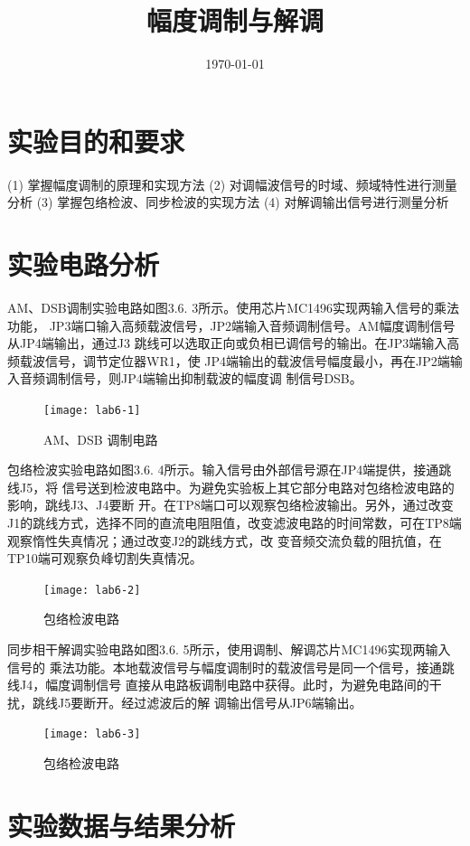 \documentclass{../source/Experiment}
\title{幅度调制与解调}
\date{\today}
\begin{document}
\makecover
\makeheader


\section{实验目的和要求}
    (1) 掌握幅度调制的原理和实现方法
    (2) 对调幅波信号的时域、频域特性进行测量分析
    (3) 掌握包络检波、同步检波的实现方法
    (4) 对解调输出信号进行测量分析

    \section{实验电路分析}

    AM、DSB调制实验电路如图3.6. 3所示。使用芯片MC1496实现两输入信号的乘法功能，    JP3端口输入高频载波信号，JP2端输入音频调制信号。AM幅度调制信号从JP4端输出，通过J3    跳线可以选取正向或负相已调信号的输出。在JP3端输入高频载波信号，调节定位器WR1，使    JP4端输出的载波信号幅度最小，再在JP2端输入音频调制信号，则JP4端输出抑制载波的幅度调    制信号DSB。

    \begin{figure}[H]
        \centering
        \texttt{[image: lab6-1]}
        \caption{AM、DSB 调制电路}
    \end{figure}

    包络检波实验电路如图3.6. 4所示。输入信号由外部信号源在JP4端提供，接通跳线J5，将    信号送到检波电路中。为避免实验板上其它部分电路对包络检波电路的影响，跳线J3、J4要断    开。在TP8端口可以观察包络检波输出。另外，通过改变J1的跳线方式，选择不同的直流电阻阻值，改变滤波电路的时间常数，可在TP8端观察惰性失真情况；通过改变J2的跳线方式，改    变音频交流负载的阻抗值，在TP10端可观察负峰切割失真情况。

    \begin{figure}[H]
        \centering
        \texttt{[image: lab6-2]}
        \caption{包络检波电路}
    \end{figure}
    
    同步相干解调实验电路如图3.6. 5所示，使用调制、解调芯片MC1496实现两输入信号的    乘法功能。本地载波信号与幅度调制时的载波信号是同一个信号，接通跳线J4，幅度调制信号    直接从电路板调制电路中获得。此时，为避免电路间的干扰，跳线J5要断开。经过滤波后的解    调输出信号从JP6端输出。

    \begin{figure}[H]
        \centering
        \texttt{[image: lab6-3]}
        \caption{包络检波电路}
    \end{figure}

    \section{实验数据与结果分析}
\end{document}
